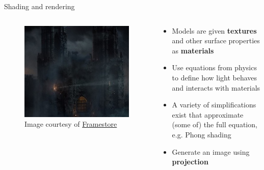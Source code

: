 \begin{frame}{Shading and rendering}
	\begin{columns}
		\begin{column}{0.3\textwidth}
			\begin{figure}
				\includegraphics[width=\textwidth]{castle_render}
				\caption*{Image courtesy of \href{https://www.framestore.com}{Framestore}}
			\end{figure}
		\end{column}
		\begin{column}{0.65\textwidth}
			\begin{itemize}
				\pause\item Models are given \textbf{textures} and other surface properties as \textbf{materials}
				\pause\item Use equations from physics to define how light behaves and interacts with materials
				\pause\item A variety of simplifications exist that approximate (some of) the full equation, e.g. Phong shading
				\pause\item Generate an image using \textbf{projection}
			\end{itemize}
		\end{column}
	\end{columns}
\end{frame}

